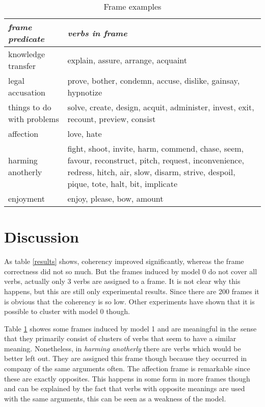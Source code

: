 \documentclass{article} %
\begin{document}
\begin{table}
\begin{tabular}{|p{}|p{}|}
  \hline
  \textit{frame predicate} & \textit{verbs in frame}\\
  \hline
  \hline
  knowledge transfer & explain, assure, arrange, acquaint\\
  \hline
  legal accusation & prove, bother, condemn, accuse, dislike, gainsay, hypnotize\\
  \hline
  things to do with problems & solve, create, design, acquit, administer, invest, exit, recount, preview, consist\\
  \hline
  affection & love, hate\\
  \hline
  harming anotherly &fight, shoot, invite, harm, commend, chase, seem, favour, reconstruct, pitch, request, inconvenience, redress, hitch, air, slow, disarm, strive, despoil, pique, tote, halt, bit, implicate\\
  \hline
  enjoyment & enjoy, please, bow, amount\\
  \hline
\end{tabular}
\caption{Frame examples}
\label{exframes}
\end{table}

\section{Discussion}
As table \ref{results} shows, coherency  improved significantly, whereas the frame correctness did not so much. But the frames induced by model 0 do not cover all verbs, actually only 3 verbs are assigned to a frame. It is not clear why this happens, but this are still only experimental results.  Since there are 200 frames it is obvious that the coherency is so low. Other experiments have shown that it is possible to cluster with model 0 though. 

Table \ref{exframes} showes some frames induced by model 1 and are meaningful in the sense that they primarily consist of clusters of verbs that seem to have a similar meaning. Nonetheless, in \textit{harming anotherly} there are verbs which would be better left out. They are assigned this frame though because they occurred in company of the same arguments often. The affection frame is remarkable since these are exactly opposites. This happens in some form in more frames though and can be explained by the fact that verbs with opposite meanings are used with the same arguments, this can be seen as a weakness of the model.
\end{document}
